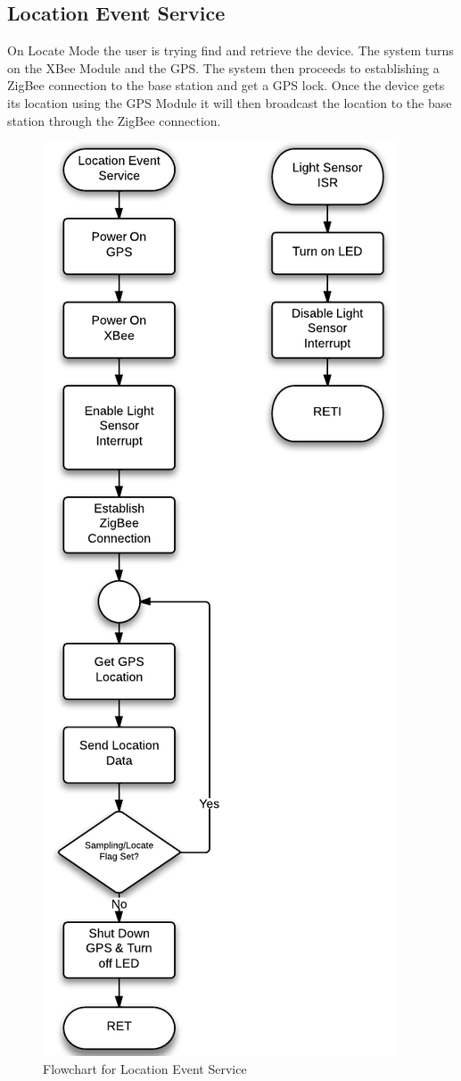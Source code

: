 \subsection{Location Event Service}
On Locate Mode the user is trying find and retrieve the device. The system turns on the XBee Module and the GPS. The system then proceeds to establishing a ZigBee connection to the base station and get a GPS lock. Once the device gets its location using the GPS Module it will then broadcast the location to the base station through the ZigBee connection.
\begin{figure}[H]
	\centering
	\includegraphics[scale=1.0]{img/LocationEventService}
	\caption{Flowchart for Location Event Service \label{fig:locateMode}}
\end{figure}

